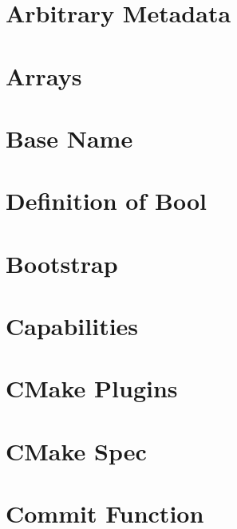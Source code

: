\documentclass[twoside]{book}
\newcommand{\+}{\discretionary{\mbox{\scriptsize$\hookleftarrow$}}{}{}}
\begin{document}
\chapter{Arbitrary Metadata}
\label{doc_decisions_arbitrary_metadata_md}

\chapter{Arrays}
\label{doc_decisions_array_md}

\chapter{Base Name}
\label{doc_decisions_base_name_md}

\chapter{Definition of Bool}
\label{doc_decisions_boolean_md}

\chapter{Bootstrap}
\label{doc_decisions_bootstrap_md}

\chapter{Capabilities}
\label{doc_decisions_capabilities_md}

\chapter{C\+Make Plugins}
\label{doc_decisions_cmake_plugins_md}

\chapter{C\+Make Spec}
\label{doc_decisions_cmake_spec_md}

\chapter{Commit Function}
\label{doc_decisions_commit_function_md}

\end{document}
